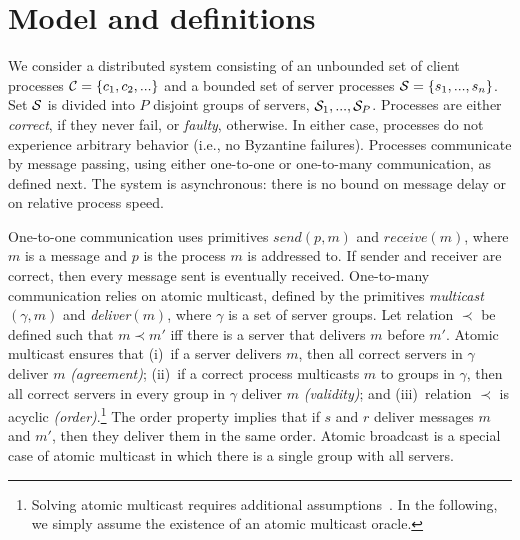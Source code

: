 
\section{Model and definitions}
\label{sec:model}

%

We consider a distributed system consisting of an unbounded set of client processes $\mathcal{C} = \{c_1, c_2, ...\}$ and a bounded set of server processes $\mathcal{S} = \{s_1, ..., s_n\}$. 
Set $\mathcal{S}$ is divided into $P$ disjoint groups of servers, $\mathcal{S}_1, ..., \mathcal{S}_P$.
Processes are either \emph{correct}, if they never fail, or \emph{faulty}, otherwise. 
In either case, processes do not experience arbitrary behavior (i.e., no Byzantine failures).
Processes communicate by message passing, using either one-to-one or one-to-many communication, as defined next.
The system is asynchronous: there is no bound on message delay or on relative process speed.

One-to-one communication uses primitives $send(p,m)$ and $receive(m)$, where $m$ is a message and $p$ is the process $m$ is addressed to. 
If sender and receiver are correct, then every message sent is eventually received. 
%
One-to-many communication relies on atomic multicast, defined by the primitives \emph{multicast}$(\gamma, m)$ and \emph{deliver}$(m)$, where $\gamma$ is a set of server groups.
%
Let relation $\prec$ be defined such that $m \prec m'$ iff there is a server that delivers $m$ before $m'$.
Atomic multicast ensures that 
(i)~if a server delivers $m$, then all correct servers in $\gamma$ deliver $m$ \emph{(agreement)};
(ii)~if a correct process multicasts $m$ to groups in $\gamma$, then all correct servers in every group in $\gamma$ deliver $m$ \emph{(validity)}; and
(iii)~relation $\prec$ is acyclic \emph{(order)}.\footnote{Solving atomic multicast requires additional assumptions~\cite{CT96,FLP85}. In the following, we simply assume the existence of an atomic multicast oracle.}
The order property implies that if $s$ and $r$ deliver messages $m$ and $m'$, then they deliver them in the same order. 
Atomic broadcast is a special case of atomic multicast in which there is a single group with all servers.

